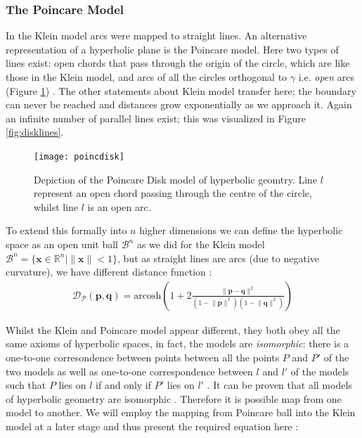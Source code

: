 \documentclass[12pt]{report}
\begin{document}
\subsubsection{The Poincare Model}
In the Klein model arcs were mapped to straight lines. An alternative representation of a hyperbolic plane is the Poincare model. Here two types of lines exist: open chords that pass through the origin of the circle, which are like those in the Klein model, and arcs of all the circles orthogonal to $\gamma$ i.e. \textit{open} arcs (Figure \ref{fig:pdisk}) \cite{Greenberg1994}. The other statements about Klein model transfer here; the boundary can never be reached and distances grow exponentially as we approach it. Again an infinite number of parallel lines exist; this was visualized in Figure \ref{fig:disklines}.

\begin{figure}
  \centering
	\texttt{[image: poincdisk]}
	\caption{Depiction of the Poincare Disk model of hyperbolic geomtry. Line $l$ represent an open chord passing through the centre of the circle, whilst line $l$ is an open arc.
}
	\label{fig:pdisk}
\end{figure}

To extend this formally into $n$ higher dimensions we can define the hyperbolic space as an open unit ball $\mathcal{B}^n$ as we did for the Klein model $\mathcal{B}^n = \{\mathbf{x} \in \mathbb{R}^n | \lVert \mathbf{x} \rVert <1 \}$, but as straight lines are arcs (due to negative curvature), we have different distance function \cite{Iversen1992}:
\begin{align}
  \mathcal{D_P}(\mathbf{p}, \mathbf{q}) = \text{arcosh} \left(1 + 2 \frac{\lVert \mathbf{p} - \mathbf{q} \rVert^2}{(1-\lVert \mathbf{p}\rVert^2)(1-\lVert \mathbf{q}\rVert^2)}   \right) 
  \label{eq:pdist}
\end{align}

Whilst the Klein and Poincare model appear different, they both obey all the same axioms of hyperbolic spaces, in fact, the models are \textit{isomorphic}: there is a one-to-one corresondence between points between all the points $P$ and $P'$ of the two models as well as one-to-one correspondence between $l$ and $l'$ of the models such that $P$ lies on $l$ if and only if $P'$ lies on $l'$ \cite{Greenberg1994}. It can be proven that all models of hyperbolic geometry are isomorphic \cite{Greenberg1994}. Therefore it is possible map from one model to another. We will employ the mapping from Poincare ball into the Klein model at a later stage and thus present the required equation here \cite{Greenberg1994}:
\end{document}
